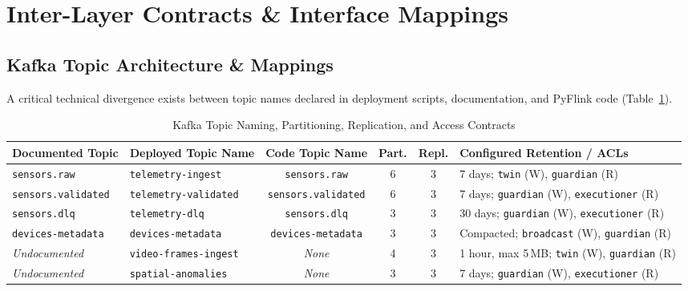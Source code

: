 \documentclass[10pt,a4paper]{report}
\begin{document}
\section{Inter-Layer Contracts \& Interface Mappings}

\subsection{Kafka Topic Architecture \& Mappings}
A critical technical divergence exists between topic names declared in deployment scripts, documentation, and PyFlink code (Table~\ref{tab:kafka_topic_contracts}).

\begin{table}[htbp]
\centering
\small
\caption{Kafka Topic Naming, Partitioning, Replication, and Access Contracts}
\label{tab:kafka_topic_contracts}
\begin{tabularx}{\textwidth}{lXcccX}
\toprule
\textbf{Documented Topic} & \textbf{Deployed Topic Name} & \textbf{Code Topic Name} & \textbf{Part.} & \textbf{Repl.} & \textbf{Configured Retention / ACLs} \\
\midrule
\texttt{sensors.raw} & \texttt{telemetry-ingest} & \texttt{sensors.raw} & 6 & 3 & 7 days; \texttt{twin} (W), \texttt{guardian} (R) \\
\texttt{sensors.validated} & \texttt{telemetry-validated} & \texttt{sensors.validated} & 6 & 3 & 7 days; \texttt{guardian} (W), \texttt{executioner} (R) \\
\texttt{sensors.dlq} & \texttt{telemetry-dlq} & \texttt{sensors.dlq} & 3 & 3 & 30 days; \texttt{guardian} (W), \texttt{executioner} (R) \\
\texttt{devices-metadata} & \texttt{devices-metadata} & \texttt{devices-metadata} & 3 & 3 & Compacted; \texttt{broadcast} (W), \texttt{guardian} (R) \\
\textit{Undocumented} & \texttt{video-frames-ingest} & \textit{None} & 4 & 3 & 1 hour, max 5\,MB; \texttt{twin} (W), \texttt{guardian} (R) \\
\textit{Undocumented} & \texttt{spatial-anomalies} & \textit{None} & 3 & 3 & 7 days; \texttt{guardian} (W), \texttt{executioner} (R) \\
\bottomrule
\end{tabularx}
\end{table}
\end{document}
